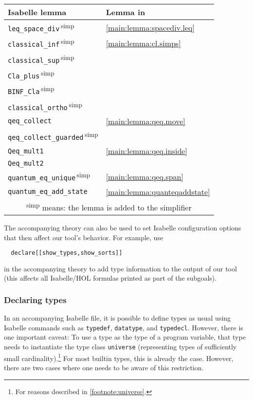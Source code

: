 \documentclass{article}
\newcommand\qrhlautorefx[1]{\autoref*{main:#1}}
\begin{document}
\begin{center}
\begin{tabular}{|ll|}
  \hline
  \bfseries Isabelle lemma
  &
    \bfseries Lemma in \cite{qrhl-paper-from-manual}
  \\
  \hline
  \hline
  \texttt{leq\_space\_div}\,\textsuperscript{simp} & \qrhlautorefx{lemma:spacediv.leq} \\
  \hline
  \texttt{classical\_inf}\,\textsuperscript{simp} & \qrhlautorefx{lemma:cl.simps} \\
  \texttt{classical\_sup}\,\textsuperscript{simp} &\\
  \texttt{Cla\_plus}\,\textsuperscript{simp} &\\
  \texttt{BINF\_Cla}\,\textsuperscript{simp} &\\
  \texttt{classical\_ortho}\,\textsuperscript{simp} &\\
  \hline
  \texttt{qeq\_collect} & \qrhlautorefx{lemma:qeq.move} \\
  \texttt{qeq\_collect\_guarded}\,\textsuperscript{simp} & \\
  \hline
  \texttt{Qeq\_mult1} & \qrhlautorefx{lemma:qeq.inside} \\
  \texttt{Qeq\_mult2} & \\
  \hline
  \texttt{quantum\_eq\_unique}\,\textsuperscript{simp} & \qrhlautorefx{lemma:qeq.span} \\
  \hline
  \texttt{quantum\_eq\_add\_state} & \qrhlautorefx{lemma:quanteqaddstate} \\
  \hline
  \hline
  \multicolumn{2}{|c|}{\textsuperscript{simp} means: the lemma is added to the simplifier} \\
  \hline
\end{tabular}
\end{center}

The accompanying theory can also be used to set Isabelle configuration
options that then affect our tool's behavior. For example, use
\begin{lstlisting}
  declare[[show_types,show_sorts]]
\end{lstlisting}
in the accompanying theory to
add type information to the output of our tool (this affects all
Isabelle/HOL formulas printed as part of the subgoals).

\subsubsection{Declaring types}
\label{sec:deftypes}

In an accompanying Isabelle file, it is possible to define types as
usual using Isabelle commands such as \texttt{typedef},
\texttt{datatype}, and \texttt{typedecl}. However, there is one important
caveat: To use a type as the type of a program variable, that type
needs to instantiate the type class \texttt{universe} (representing
types of sufficiently small cardinality).\footnote{For reasons described in
  \autoref{footnote:universe}.} For most builtin types, this is
already the case. However, there are two cases where one needs to be
aware of this restriction.
\end{document}
